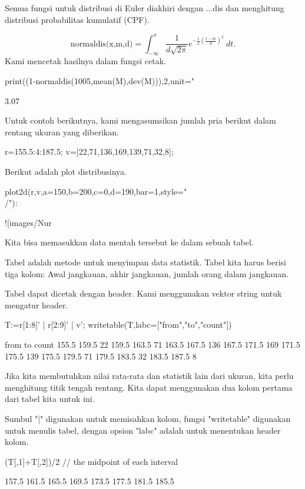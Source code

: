 \documentclass{article}
\begin{document}
Semua fungsi untuk distribusi di Euler diakhiri dengan ...dis dan
menghitung distribusi probabilitas kumulatif (CPF).


$$\text{normaldis(x,m,d)}=\int_{-\infty}^x \frac{1}{d\sqrt{2\pi}}e^{-\frac{1}{2 }(\frac{t-m}{d})^2}\ dt.$$Kami mencetak hasilnya dalam %
fungsi cetak.


\>print((1-normaldis(1005,mean(M),dev(M))),2,unit=" %


          3.07 %

Untuk contoh berikutnya, kami mengasumsikan jumlah pria berikut dalam
rentang ukuran yang diberikan.


\>r=155.5:4:187.5; v=[22,71,136,169,139,71,32,8];


Berikut adalah plot distribusinya.


\>plot2d(r,v,a=150,b=200,c=0,d=190,bar=1,style="\\/"):


![images/Nur%

Kita bisa memasukkan data mentah tersebut ke dalam sebuah tabel.


Tabel adalah metode untuk menyimpan data statistik. Tabel kita harus
berisi tiga kolom: Awal jangkauan, akhir jangkauan, jumlah orang dalam
jangkauan.


Tabel dapat dicetak dengan header. Kami menggunakan vektor string
untuk mengatur header.


\>T:=r[1:8]' | r[2:9]' | v'; writetable(T,labc=["from","to","count"])


          from        to     count
         155.5     159.5        22
         159.5     163.5        71
         163.5     167.5       136
         167.5     171.5       169
         171.5     175.5       139
         175.5     179.5        71
         179.5     183.5        32
         183.5     187.5         8

Jika kita membutuhkan nilai rata-rata dan statistik lain dari ukuran,
kita perlu menghitung titik tengah rentang. Kita dapat menggunakan dua
kolom pertama dari tabel kita untuk ini.


Sumbul "|" digunakan untuk memisahkan kolom, fungsi "writetable"
digunakan untuk menulis tabel, dengan opsion "labc" adalah untuk
menentukan header kolom.


\>(T[,1]+T[,2])/2 // the midpoint of each interval


            157.5 
            161.5 
            165.5 
            169.5 
            173.5 
            177.5 
            181.5 
            185.5 
\end{document}
